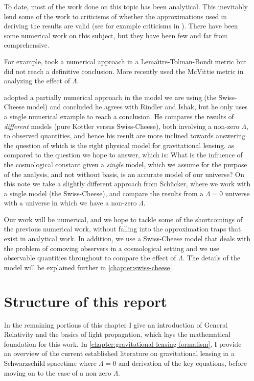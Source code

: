 To date, most of the work done on this topic has been analytical. This inevitably lend some of the work to criticisms of whether the approximations used in deriving the results are valid (see for example criticisms in \citet{ishak2010more}). There have been some numerical work on this subject, but they have been few and far from comprehensive. 

For example, \citet{beynon2012testing} took a numerical approach in a Lema{\^\i}tre-Tolman-Bondi metric \citep{lemaitre1997expanding,tolman1934effect,bondi1947spherically} but did not reach a definitive conclusion. More recently \citep{aghili2017effect} used the McVittie metric \citep{mcvittie1933mass} in analyzing the effect of $\Lambda$. 

\citet{schucker2009strong} adopted a partially numerical approach in the model we are using (the Swiss-Cheese model) and concluded he agrees with Rindler and Ishak, but he only uses a single numerical example to reach a conclusion. He compares the results of \emph{different} models (pure Kottler versus Swiss-Cheese), both involving a non-zero $\Lambda$, to observed quantities, and hence his result are more inclined towards answering the question of which is the right physical model for gravitational lensing, as compared to the question we hope to answer, which is: What is the influence of the cosmological constant given a \emph{single} model, which we assume for the purpose of the analysis, and not without basis, is an accurate model of our universe? On this note we take a slightly different approach from Sch{\"u}cker, where we work with a single model (the Swiss-Cheese), and compare the results from a $\Lambda = 0$ universe with a universe in which we have a non-zero $\Lambda$. 

Our work will be numerical, and we hope to tackle some of the shortcomings of the previous numerical work, without falling into the approximation traps that exist in analytical work. In addition, we use a Swiss-Cheese model that deals with the problem of comoving observers in a cosmological setting and we use observable quantities throughout to compare the effect of $\Lambda$. The details of the model will be explained further in \autoref{chapter:swiss-cheese}.

\section{Structure of this report}
In the remaining portions of this chapter I give an introduction of General Relativity and the basics of light propagation, which lays the mathematical foundation for this work. In \autoref{chapter:gravitational-lensing-formalism}, I provide an overview of the current established literature on gravitational lensing in a Schwarzschild spacetime where $\Lambda = 0$ and derivation of the key equations, before moving on to the case of a non zero $\Lambda$. 

